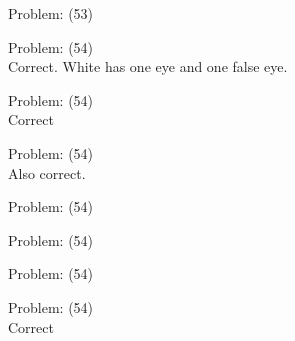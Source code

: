 \documentclass[11pt]{article}
\begin{document}
\begin{minipage}[t]{0.5\textwidth}
  {\centering
  
  Problem: (53)\\
  
  }
\end{minipage}
\begin{minipage}[t]{0.5\textwidth}
  {\centering
  
  Problem: (54)\\
  Correct. White has one eye and one false eye.\\
  }
\end{minipage}
\begin{minipage}[t]{0.5\textwidth}
  {\centering
  
  Problem: (54)\\
  Correct\\
  }
\end{minipage}
\begin{minipage}[t]{0.5\textwidth}
  {\centering
  
  Problem: (54)\\
  Also correct.\\
  }
\end{minipage}
\begin{minipage}[t]{0.5\textwidth}
  {\centering
  
  Problem: (54)\\
  
  }
\end{minipage}
\begin{minipage}[t]{0.5\textwidth}
  {\centering
  
  Problem: (54)\\
  
  }
\end{minipage}
\begin{minipage}[t]{0.5\textwidth}
  {\centering
  
  Problem: (54)\\
  
  }
\end{minipage}
\begin{minipage}[t]{0.5\textwidth}
  {\centering
  
  Problem: (54)\\
  Correct\\
  }
\end{minipage}
\end{document}
